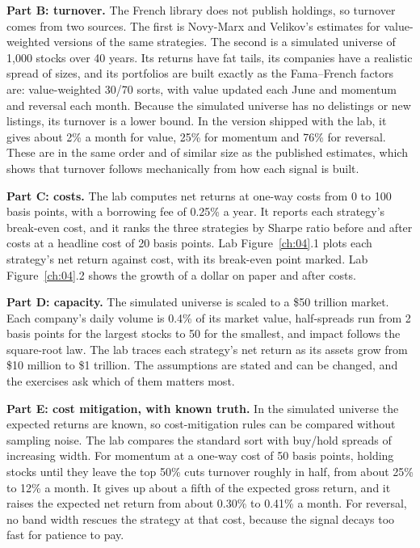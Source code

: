 \textbf{Part B: turnover.} The French library does not publish holdings, so turnover comes from two sources. The first is Novy-Marx and Velikov's estimates for value-weighted versions of the same strategies. The second is a simulated universe of 1,000 stocks over 40 years. Its returns have fat tails, its companies have a realistic spread of sizes, and its portfolios are built exactly as the Fama--French factors are: value-weighted 30/70 sorts, with value updated each June and momentum and reversal each month. Because the simulated universe has no delistings or new listings, its turnover is a lower bound. In the version shipped with the lab, it gives about 2\% a month for value, 25\% for momentum and 76\% for reversal. These are in the same order and of similar size as the published estimates, which shows that turnover follows mechanically from how each signal is built.

\textbf{Part C: costs.} The lab computes net returns at one-way costs from 0 to 100 basis points, with a borrowing fee of 0.25\% a year. It reports each strategy's break-even cost, and it ranks the three strategies by Sharpe ratio before and after costs at a headline cost of 20 basis points. Lab Figure~\ref{ch:04}.1 plots each strategy's net return against cost, with its break-even point marked. Lab Figure~\ref{ch:04}.2 shows the growth of a dollar on paper and after costs.

\textbf{Part D: capacity.} The simulated universe is scaled to a \$50 trillion market. Each company's daily volume is 0.4\% of its market value, half-spreads run from 2 basis points for the largest stocks to 50 for the smallest, and impact follows the square-root law. The lab traces each strategy's net return as its assets grow from \$10 million to \$1 trillion. The assumptions are stated and can be changed, and the exercises ask which of them matters most.

\textbf{Part E: cost mitigation, with known truth.} In the simulated universe the expected returns are known, so cost-mitigation rules can be compared without sampling noise. The lab compares the standard sort with buy/hold spreads of increasing width. For momentum at a one-way cost of 50 basis points, holding stocks until they leave the top 50\% cuts turnover roughly in half, from about 25\% to 12\% a month. It gives up about a fifth of the expected gross return, and it raises the expected net return from about 0.30\% to 0.41\% a month. For reversal, no band width rescues the strategy at that cost, because the signal decays too fast for patience to pay.

